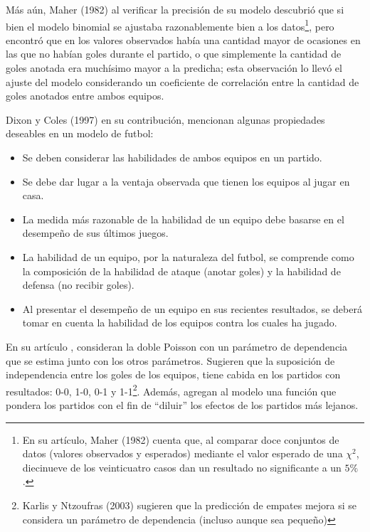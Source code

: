 Más aún, Maher (1982) \cite{maher1982modelling} al verificar la precisión de su modelo descubrió que si bien el modelo binomial se ajustaba razonablemente bien a los datos\footnote{En su artículo, Maher (1982) \cite{maher1982modelling} cuenta que, al comparar doce conjuntos de datos (valores observados y esperados) mediante el valor esperado de una $\chi^2$, diecinueve de los veinticuatro casos dan un resultado no significante a un $5\%$.}, pero encontró que en los valores observados había una cantidad mayor de ocasiones en las que no habían goles durante el partido, o que simplemente la cantidad de goles anotada era muchísimo mayor a la predicha; esta observación lo llevó el ajuste del modelo considerando un coeficiente de correlación entre la cantidad de goles anotados entre ambos equipos.

Dixon y Coles (1997) \cite{dixon1997modelling} en su contribución, mencionan algunas propiedades deseables en un modelo de futbol:
\begin{itemize}
	\item Se deben considerar las habilidades de ambos equipos en un partido.
	\item Se debe dar lugar a la ventaja observada que tienen los equipos al jugar en casa.
	\item La medida más razonable de la habilidad de un equipo debe basarse en el desempeño de sus últimos juegos.
	\item La habilidad de un equipo, por la naturaleza del futbol, se comprende como la composición de la habilidad de ataque (anotar goles) y la habilidad de defensa (no recibir goles).
	\item Al presentar el desempeño de un equipo en sus recientes resultados, se deberá tomar en cuenta la habilidad de los equipos contra los cuales ha jugado.
\end{itemize}

En su artículo \cite{dixon1997modelling}, consideran la doble Poisson con un parámetro de dependencia que se estima junto con los otros parámetros. Sugieren que la suposición de independencia entre los goles de los equipos, tiene cabida en los partidos con resultados: 0-0, 1-0, 0-1 y 1-1\footnote{Karlis y Ntzoufras (2003) \cite{karlis2003analysis} sugieren que la predicción de empates mejora si se considera un parámetro de dependencia (incluso aunque sea pequeño)}. Además, agregan al modelo una función que pondera los partidos con el fin de ``diluir'' los efectos de los partidos más lejanos. 

